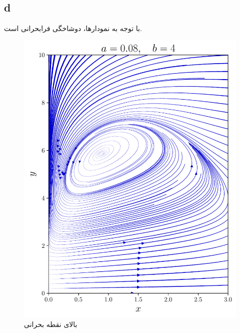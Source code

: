 \documentclass[12pt,a4paper]{article}
\begin{document}
	\subsection{d}
	با توجه به نمودارها، دوشاخگی  فرابحرانی است.
	\begin{figure}[h!]
		\centering
		\includegraphics[width=\linewidth]{fig/8.2.9.overcrit}
		\caption{بالای نقطه بحرانی}
	\end{figure}
	\restoregeometry
\end{document}
